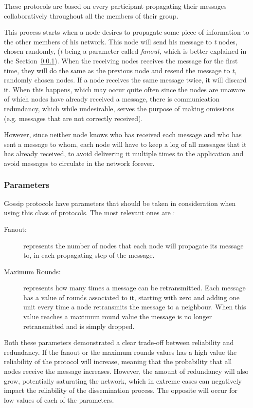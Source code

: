 These protocols are based on every participant propagating their messages collaboratively
throughout all the members of their group.

This process starts when a node desires to propagate some piece of information to the other
members of his network. This node will send his message to \textit{t} nodes, chosen randomly,
(\textit{t} being a parameter called \textit{fanout}, which is better explained in the
Section~\ref{subsubsec:gossip_parameters}). When the receiving nodes receives the message for
the first time, they will do the same as the previous node and resend the message to
\textit{t}, randomly chosen nodes. If a node receives the same message twice, it will discard
it. When this happens, which may occur quite often since the nodes are unaware of which nodes
have already received a message, there is communication redundancy, which while undesirable,
serves the purpose of making omissions (e.g. messages that are not correctly received).

However, since neither node knows who has received each message and who has sent a
message to whom, each node will have to keep a log of all messages that it has already
received, to avoid delivering it multiple times to the application and avoid messages
to circulate in the network forever.


\subsubsection{Parameters}
\label{subsubsec:gossip_parameters}
Gossip protocols have parameters that should be taken in consideration when using this
class of protocols. The most relevant ones are \cite{Leitao2012}:
\begin{description}
      \item[Fanout:] represents the number of nodes that each node will propagate its message
            to, in each propagating step of the message.
      \item[Maximum Rounds:] represents how many times a message can be retransmitted. Each
            message has a value of rounds associated to it, starting with zero and adding one
            unit every time a node retransmits the message to a neighbour. When this value
            reaches a maximum round value the message is no longer retransmitted and is simply
            dropped.
\end{description}

Both these parameters demonstrated a clear trade-off between reliability and redundancy. If
the fanout or the maximum rounds values has a high value the reliability of the protocol will
increase, meaning that the probability that all nodes receive the message increases. However,
the amount of redundancy will also grow, potentially saturating the network, which in extreme
cases can negatively impact the reliability of the dissemination process. The opposite will
occur for low values of each of the parameters.


